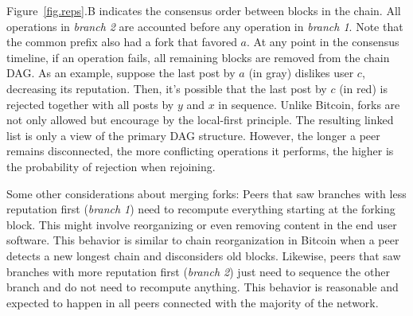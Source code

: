 \documentclass[10pt,journal,compsoc]{IEEEtran}
\newcommand{\reps} {\emph{reps}\xspace}
\begin{document}

Figure~\ref{fig.reps}.B indicates the consensus order between blocks in the
chain.
All operations in \emph{branch 2} are accounted before any operation in
\emph{branch 1}.
Note that the common prefix also had a fork that favored $a$.
%
At any point in the consensus timeline, if an operation fails, all remaining
blocks are removed from the chain DAG.
As an example, suppose the last post by $a$ (in gray) dislikes user $c$,
decreasing its reputation.
Then, it's possible that the last post by $c$ (in red) is rejected together
with all posts by $y$ and $x$ in sequence.
%
Unlike Bitcoin, forks are not only allowed but encourage by the local-first
principle.
The resulting linked list is only a view of the primary DAG structure.
However, the longer a peer remains disconnected, the more conflicting
operations it performs, the higher is the probability of rejection when
rejoining.

Some other considerations about merging forks:
Peers that saw branches with less reputation first (\emph{branch 1}) need to
recompute everything starting at the forking block.
This might involve reorganizing or even removing content in the end user
software.
This behavior is similar to chain reorganization in Bitcoin when a peer detects
a new longest chain and disconsiders old blocks.
%
Likewise, peers that saw branches with more reputation first (\emph{branch 2})
just need to sequence the other branch and do not need to recompute anything.
This behavior is reasonable and expected to happen in all peers connected with
the majority of the network.

\end{document}
